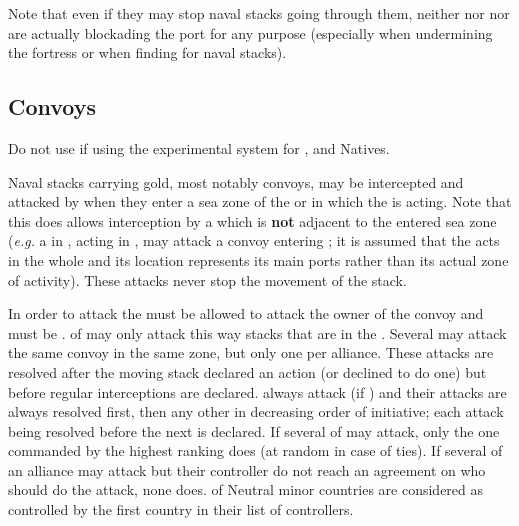 Note that even if they may stop naval stacks going through them, neither
\StraitFort nor \Presidios nor \USURE are actually blockading the port for any
purpose (especially when undermining the fortress or when finding \SoS for
naval stacks).

\subsection{Convoys}
\label{chMilitary:Convoys}
\begin{designnote}
  Do not use if using the experimental system for \REVOLT, \corsaire and
  Natives.
\end{designnote}

Naval stacks carrying gold, most notably convoys, may be intercepted and
attacked by \corsaire when they enter a sea zone of the \STZ or \CTZ in which
the \corsaire is acting. Note that this does allows interception by a
\corsaire which is \textbf{not} adjacent to the entered sea zone (\emph{e.g.}
a \corsaire in , acting in , may
attack a convoy entering \seazoneMexique; it is assumed that the \corsaire
acts in the whole \STZ and its location represents its main ports rather than
its actual zone of activity). These attacks never stop the movement of the
stack.

In order to attack the \corsaire must be allowed to attack the owner of the
convoy and must be \Faceplus. \corsaire of \Barbaresques may only attack this
way stacks that are in the . Several \corsaire may attack
the same convoy in the same zone, but only one per alliance. These attacks are
resolved after the moving stack declared an action (or declined to do one) but
before regular interceptions are declared.  \corsaire always
attack (if \Faceplus) and their attacks are always resolved first, then any
other in decreasing order of initiative; each attack being resolved before the
next is declared. If several \corsaire of  may attack, only the
one commanded by the highest ranking \LeaderA does (at random in case of
ties). If several \corsaire of an alliance may attack but their controller do
not reach an agreement on who should do the attack, none does. \corsaire of
Neutral minor countries are considered as controlled by the first country in
their list of controllers.

